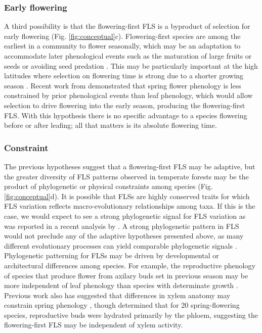 \documentclass[11pt]{article}
\begin{document}
\subsubsection*{Early flowering}
\noindent A third possibility is that the flowering-first FLS is a byproduct of selection for early flowering  (Fig. \ref{fig:conceptual}c). Flowering-first species are among the earliest in a community to flower seasonally, which may be an adaptation to accommodate later phenological events such as the  maturation of large fruits or seeds \citep{Li2016,Primack1987,Ettinger2018} or avoiding seed predation \citep{Schermer2020}. This may be particularly important at the high latitudes where selection on flowering time is strong due  to a shorter growing season \citep{MunguiaRosas2011}. Recent work from \citet{Savage2019} demonstrated that spring flower phenology is less constrained by prior phenological events than leaf phenology, which would allow selection to drive flowering into the early season, producing the flowering-first FLS. With this hypothesis there is no specific advantage to a species flowering before or after leafing; all that matters is its absolute flowering time.

\subsubsection*{Constraint}
\noindent {}The previous hypotheses suggest that a flowering-first FLS may be adaptive, but the greater diversity of FLS patterns observed in temperate forests may be the product of phylogenetic \citep{Gougherty2018} or physical \citep{Diggle1995,Diggle1999,Schaik1993} constraints among species  (Fig. \ref{fig:conceptual}d). It is possible that FLSs are highly conserved traits for which FLS variation reflects macro-evolutionary relationships among taxa. If this is the case, we would expect to see a strong phylogenetic signal for FLS variation as was reported in a recent analysis by \citet{Gougherty2018}. A strong phylogenetic pattern in FLS would not preclude any of the adaptive hypotheses presented above, as many different evolutionary processes can yield comparable phylogenetic signals \citep{Revell2008}.\\

\noindent Phylogenetic patterning for FLSs may be driven by developmental or architectural differences among species. For example, the reproductive phenology of species that produce flower from axilary buds set in previous season may be more independent of leaf phenology than species with determinate growth \citep{Rathcke_1985,Borchert1983,Schaik1993}. Previous work also has suggested that differences in xylem anatomy may constrain spring phenology \citep{Lechowicz_1995}, though \citet{Savage2019} determined that for 20 spring-flowering species, reproductive buds were hydrated primarily by the phloem, suggesting the flowering-first FLS may be independent of xylem activity. \\
\end{document}
